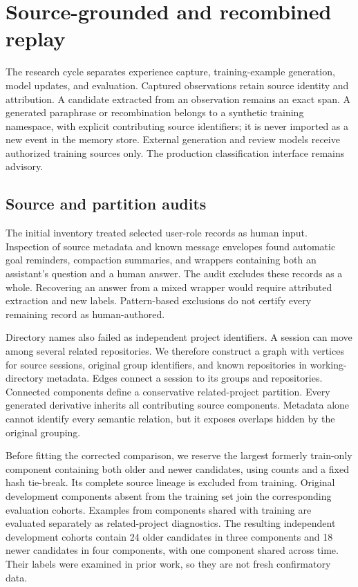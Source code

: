 \section{Source-grounded and recombined replay}
\label{sec:replay}
The research cycle separates experience capture, training-example generation, model updates, and evaluation. Captured observations retain source identity and attribution. A candidate extracted from an observation remains an exact span. A generated paraphrase or recombination belongs to a synthetic training namespace, with explicit contributing source identifiers; it is never imported as a new event in the memory store. External generation and review models receive authorized training sources only. The production classification interface remains advisory.

\subsection{Source and partition audits}
The initial inventory treated selected user-role records as human input. Inspection of source metadata and known message envelopes found automatic goal reminders, compaction summaries, and wrappers containing both an assistant's question and a human answer. The audit excludes these records as a whole. Recovering an answer from a mixed wrapper would require attributed extraction and new labels. Pattern-based exclusions do not certify every remaining record as human-authored.

Directory names also failed as independent project identifiers. A session can move among several related repositories. We therefore construct a graph with vertices for source sessions, original group identifiers, and known repositories in working-directory metadata. Edges connect a session to its groups and repositories. Connected components define a conservative related-project partition. Every generated derivative inherits all contributing source components. Metadata alone cannot identify every semantic relation, but it exposes overlaps hidden by the original grouping.

Before fitting the corrected comparison, we reserve the largest formerly train-only component containing both older and newer candidates, using counts and a fixed hash tie-break. Its complete source lineage is excluded from training. Original development components absent from the training set join the corresponding evaluation cohorts. Examples from components shared with training are evaluated separately as related-project diagnostics. The resulting independent development cohorts contain 24 older candidates in three components and 18 newer candidates in four components, with one component shared across time. Their labels were examined in prior work, so they are not fresh confirmatory data.

